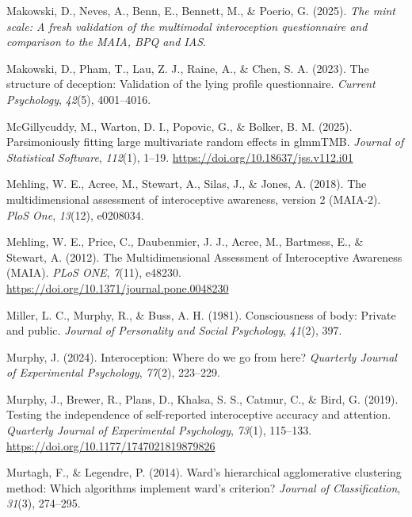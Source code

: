 \documentclass[
  jou,
  floatsintext,
  longtable,
  nolmodern,
  notxfonts,
  notimes,
  colorlinks=true,linkcolor=blue,citecolor=blue,urlcolor=blue]{apa7}
\newlength{\cslhangindent}
\newenvironment{CSLReferences}[2] %
 {\begin{list}{}{%
  \setlength{\itemindent}{0pt}
  \setlength{\leftmargin}{0pt}
  \setlength{\parsep}{0pt}
  \ifodd #1
   \setlength{\leftmargin}{\cslhangindent}
   \setlength{\itemindent}{-1\cslhangindent}
  \fi
  \setlength{\itemsep}{#2\baselineskip}}}
 {\end{list}}
\begin{document}
\begin{CSLReferences}{1}{0}
Makowski, D., Neves, A., Benn, E., Bennett, M., \& Poerio, G. (2025).
\emph{The mint scale: A fresh validation of the multimodal interoception
questionnaire and comparison to the MAIA, BPQ and IAS}.

Makowski, D., Pham, T., Lau, Z. J., Raine, A., \& Chen, S. A. (2023).
The structure of deception: Validation of the lying profile
questionnaire. \emph{Current Psychology}, \emph{42}(5), 4001--4016.

McGillycuddy, M., Warton, D. I., Popovic, G., \& Bolker, B. M. (2025).
Parsimoniously fitting large multivariate random effects in {glmmTMB}.
\emph{Journal of Statistical Software}, \emph{112}(1), 1--19.
\url{https://doi.org/10.18637/jss.v112.i01}

Mehling, W. E., Acree, M., Stewart, A., Silas, J., \& Jones, A. (2018).
The multidimensional assessment of interoceptive awareness, version 2
(MAIA-2). \emph{PloS One}, \emph{13}(12), e0208034.

Mehling, W. E., Price, C., Daubenmier, J. J., Acree, M., Bartmess, E.,
\& Stewart, A. (2012). The Multidimensional Assessment of Interoceptive
Awareness (MAIA). \emph{PLoS ONE}, \emph{7}(11), e48230.
\url{https://doi.org/10.1371/journal.pone.0048230}

Miller, L. C., Murphy, R., \& Buss, A. H. (1981). Consciousness of body:
Private and public. \emph{Journal of Personality and Social Psychology},
\emph{41}(2), 397.

Murphy, J. (2024). Interoception: Where do we go from here?
\emph{Quarterly Journal of Experimental Psychology}, \emph{77}(2),
223--229.

Murphy, J., Brewer, R., Plans, D., Khalsa, S. S., Catmur, C., \& Bird,
G. (2019). Testing the independence of self-reported interoceptive
accuracy and attention. \emph{Quarterly Journal of Experimental
Psychology}, \emph{73}(1), 115--133.
\url{https://doi.org/10.1177/1747021819879826}

Murtagh, F., \& Legendre, P. (2014). Ward's hierarchical agglomerative
clustering method: Which algorithms implement ward's criterion?
\emph{Journal of Classification}, \emph{31}(3), 274--295.


\end{CSLReferences}
\end{document}
